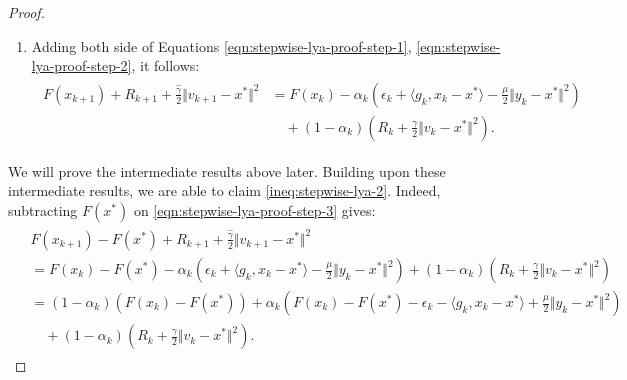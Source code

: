 \documentclass[12pt]{article}
\begin{document}
\begin{proof}
\begin{enumerate}
            \item Adding both side of Equations \eqref{eqn:stepwise-lya-proof-step-1}, \eqref{eqn:stepwise-lya-proof-step-2}, it follows:
            \begin{align}\tag{Step 3}\label{eqn:stepwise-lya-proof-step-3}
                \begin{split}
                    F(x_{k + 1}) + R_{k + 1} +
                    \frac{\hat \gamma}{2}\Vert v_{k + 1} - x^*\Vert^2
                    &=
                    F(x_k) - \alpha_k\left(
                        \epsilon_k + \langle g_k, x_k - x^*\rangle
                        - \frac{\mu}{2}\Vert y_k - x^*\Vert^2
                    \right)
                    \\
                    & \quad
                    +
                    (1 - \alpha_k)\left(
                        R_k + \frac{\gamma}{2}\Vert v_k - x^*\Vert^2
                    \right).
                \end{split}
            \end{align}
        \end{enumerate}
        We will prove the intermediate results above later.
        Building upon these intermediate results, we are able to claim \eqref{ineq:stepwise-lya-2}. Indeed,
         subtracting $F(x^*)$ on \eqref{eqn:stepwise-lya-proof-step-3} gives:
        \begin{align}
            \begin{split}\label{eqn:stepwise-lya-proof-eqn3.2}
                & F(x_{k + 1}) - F(x^*) + R_{k + 1} +
                \frac{\hat \gamma}{2}\Vert v_{k + 1} - x^*\Vert^2
                \\
                &=
                F(x_k) - F(x^*) - \alpha_k\left(
                    \epsilon_k + \langle g_k, x_k - x^*\rangle
                    - \frac{\mu}{2}\Vert y_k - x^*\Vert^2
                \right)
                +
                (1 - \alpha_k)\left(
                    R_k + \frac{\gamma}{2}\Vert v_k - x^*\Vert^2
                \right)
                \\
                &= (1 - \alpha_k)(F(x_k) - F(x^*))
                + \alpha_k\left(
                    F(x_k) - F(x^*) - \epsilon_k - \langle g_k, x_k - x^*\rangle + \frac{\mu}{2}\Vert y_k - x^*\Vert^2
                \right)
                \\ &\quad
                    +
                    (1 - \alpha_k)\left(
                        R_k + \frac{\gamma}{2}\Vert v_k - x^*\Vert^2
                    \right).

\end{split}
\end{align}
\end{proof}
\end{document}
